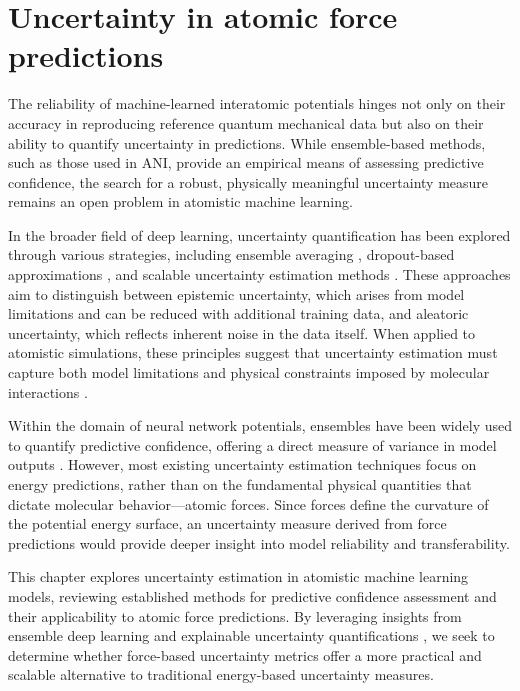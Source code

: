 \chapter{Uncertainty in atomic force predictions}
\label{chapter3}

The reliability of machine-learned interatomic potentials hinges not only on their accuracy in reproducing reference quantum mechanical data but also on their ability to quantify uncertainty in predictions. While ensemble-based methods, such as those used in ANI, provide an empirical means of assessing predictive confidence, the search for a robust, physically meaningful uncertainty measure remains an open problem in atomistic machine learning.

In the broader field of deep learning, uncertainty quantification has been explored through various strategies, including ensemble averaging \cite{optimal_ensemble_averaging_naftaly}, dropout-based approximations \cite{uncertainty_quantification_dropout_wen}, and scalable uncertainty estimation methods \cite{scalable_uncertainty_scalia, scalable_uncertainty_lakshminarayanan}. These approaches aim to distinguish between epistemic uncertainty, which arises from model limitations and can be reduced with additional training data, and aleatoric uncertainty, which reflects inherent noise in the data itself. When applied to atomistic simulations, these principles suggest that uncertainty estimation must capture both model limitations and physical constraints imposed by molecular interactions \cite{uncertainty_atomistic_ml_peterson}.

Within the domain of neural network potentials, ensembles have been widely used to quantify predictive confidence, offering a direct measure of variance in model outputs \cite{uncertainty_of_nnp_ensembles_kahle}. However, most existing uncertainty estimation techniques focus on energy predictions, rather than on the fundamental physical quantities that dictate molecular behavior—atomic forces. Since forces define the curvature of the potential energy surface, an uncertainty measure derived from force predictions would provide deeper insight into model reliability and transferability.

This chapter explores uncertainty estimation in atomistic machine learning models, reviewing established methods for predictive confidence assessment and their applicability to atomic force predictions. By leveraging insights from ensemble deep learning \cite{ensemble_deep_learning_review_ganaie} and explainable uncertainty quantifications \cite{uncertainty_quantification_yang}, we seek to determine whether force-based uncertainty metrics offer a more practical and scalable alternative to traditional energy-based uncertainty measures.


